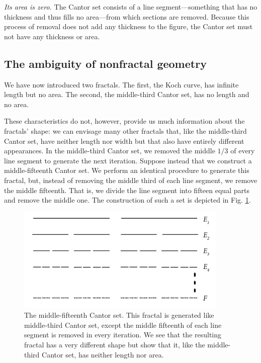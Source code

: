 \begin{myobs}\textit{Its area is zero.} The Cantor set consists of a line segment---something that has no thickness and thus fills no area---from which sections are removed. Because this process of removal does not add any thickness to the figure, the Cantor set must not have any thickness or area.\end{myobs}

\subsection{The ambiguity of nonfractal geometry}
We have now introduced two fractals. The first, the Koch curve, has infinite length but no area. The second, the middle-third Cantor set, has no length and no area. 

These characteristics do not, however, provide us much information about the fractals' shape: we can envisage many other fractals that, like the middle-third Cantor set, have neither length nor width but that also have entirely different appearances. In the middle-third Cantor set, we removed the middle $1/3$ of every line segment to generate the next iteration. Suppose instead that we construct a middle-fifteenth Cantor set. We perform an identical procedure to generate this fractal, but, instead of removing the middle third of each line segment, we remove the middle fifteenth. That is, we divide the line segment into fifteen equal parts and remove the middle one. The construction of such a set is depicted in Fig. \ref{fig:middle15}. 

\begin{figure}[h]
\centering
\includegraphics[width=0.9\textwidth]{Chapters/Figures/middle15.png} 
\caption[Middle-fifteenth Cantor set]{The middle-fifteenth Cantor set. This fractal is generated like middle-third Cantor set, except the middle fifteenth of each line segment is removed in every iteration. We see that the resulting fractal has a very different shape but show that it, like the middle-third Cantor set, has neither length nor area.}\label{fig:middle15}
\end{figure}

